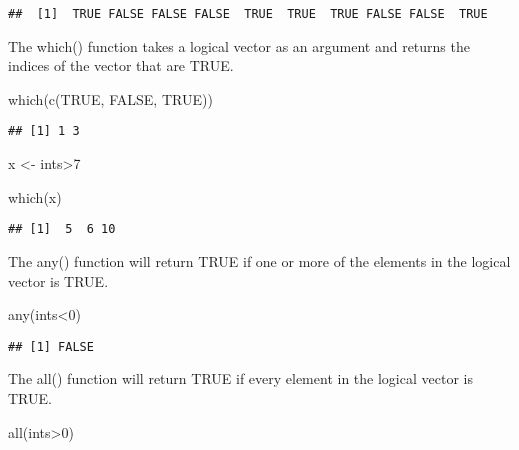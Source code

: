 \documentclass[
]{book}
\newenvironment{Shaded}{\begin{snugshade}}{\end{snugshade}}
\newcommand{\ConstantTok}[1]{\textcolor[rgb]{0.00,0.00,0.00}{#1}}
\newcommand{\DecValTok}[1]{\textcolor[rgb]{0.00,0.00,0.81}{#1}}
\newcommand{\FunctionTok}[1]{\textcolor[rgb]{0.00,0.00,0.00}{#1}}
\newcommand{\NormalTok}[1]{#1}
\newcommand{\OtherTok}[1]{\textcolor[rgb]{0.56,0.35,0.01}{#1}}
\newcommand{\SpecialCharTok}[1]{\textcolor[rgb]{0.00,0.00,0.00}{#1}}
\begin{document}
\begin{verbatim}
##  [1]  TRUE FALSE FALSE FALSE  TRUE  TRUE  TRUE FALSE FALSE  TRUE
\end{verbatim}

The which() function takes a logical vector as an argument and returns the indices of the vector that are TRUE.

\begin{Shaded}
\begin{Highlighting}[]
\FunctionTok{which}\NormalTok{(}\FunctionTok{c}\NormalTok{(}\ConstantTok{TRUE}\NormalTok{, }\ConstantTok{FALSE}\NormalTok{, }\ConstantTok{TRUE}\NormalTok{))}
\end{Highlighting}
\end{Shaded}

\begin{verbatim}
## [1] 1 3
\end{verbatim}

\begin{Shaded}
\begin{Highlighting}[]
\NormalTok{x }\OtherTok{\textless{}{-}}\NormalTok{ ints}\SpecialCharTok{\textgreater{}}\DecValTok{7}

\FunctionTok{which}\NormalTok{(x)}
\end{Highlighting}
\end{Shaded}

\begin{verbatim}
## [1]  5  6 10
\end{verbatim}

The any() function will return TRUE if one or more of the elements in the logical vector is TRUE.

\begin{Shaded}
\begin{Highlighting}[]
\FunctionTok{any}\NormalTok{(ints}\SpecialCharTok{\textless{}}\DecValTok{0}\NormalTok{)}
\end{Highlighting}
\end{Shaded}

\begin{verbatim}
## [1] FALSE
\end{verbatim}

The all() function will return TRUE if every element in the logical vector is TRUE.

\begin{Shaded}
\begin{Highlighting}[]
\FunctionTok{all}\NormalTok{(ints}\SpecialCharTok{\textgreater{}}\DecValTok{0}\NormalTok{)}
\end{Highlighting}
\end{Shaded}
\end{document}
